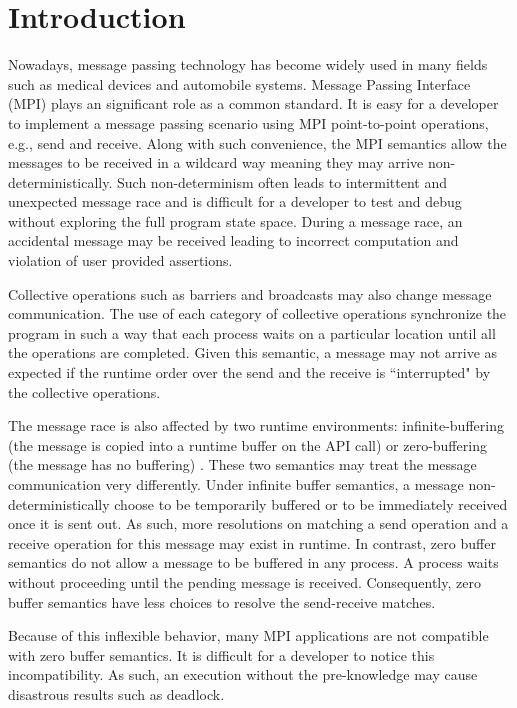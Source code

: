 \section{Introduction}
Nowadays, message passing technology has become widely used in many fields such as medical devices and automobile systems. Message Passing Interface (MPI) plays an significant role as a common standard. It is easy for a developer to implement a message passing scenario using MPI point-to-point operations, e.g., send and receive. Along with such convenience, the MPI semantics allow the messages to be received in a wildcard way meaning they may arrive non-deterministically. Such non-determinism often leads to intermittent and unexpected message race and is difficult for a developer to test and debug without exploring the full program state space. During a message race, an accidental message may be received leading to incorrect computation and violation of user provided assertions. 

Collective operations such as barriers and broadcasts may also change message communication. The use of each category of collective operations synchronize the program in such a way that each process waits on a particular location until all the operations are completed. Given this semantic, a message may not arrive as expected if the runtime order over the send and the receive is ``interrupted" by the collective operations.

The message race is also affected by two runtime environments: infinite-buffering (the message is copied into a runtime buffer on the API call) or zero-buffering (the message has no buffering) \cite{DBLP:conf/fm/VakkalankaVGK09}. These two semantics may treat the message communication very differently. Under infinite buffer semantics, a message non-deterministically choose to be temporarily buffered or to be immediately received once it is sent out. As such, more resolutions on matching a send operation and a receive operation for this message may exist in runtime. In contrast, zero buffer semantics do not allow a message to be buffered in any process. A process waits without proceeding until the pending message is received. Consequently, zero buffer semantics have less choices to resolve the send-receive matches. 

Because of this inflexible behavior, many MPI applications are not compatible with zero buffer semantics. It is difficult for a developer to notice this incompatibility. As such, an execution without the pre-knowledge may cause disastrous results such as deadlock. 

